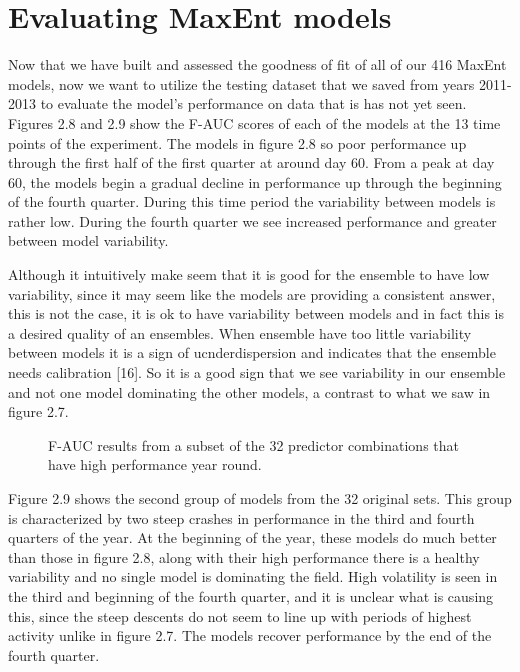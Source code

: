\section{Evaluating MaxEnt models}

Now that we have built and assessed the goodness of fit of all of our 416 MaxEnt models, now we want to utilize the testing dataset that we saved from years 2011-2013 to evaluate the model's performance on data that is has not yet seen. Figures 2.8 and 2.9 show the F-AUC scores of each of the models at the 13 time points of the experiment. The models in figure 2.8 so poor performance up through the first half of the first quarter at around day 60. From a peak at day 60, the models begin a gradual decline in performance up through the beginning of the fourth quarter. During this time period the variability between models is rather low. During the fourth quarter we see increased performance and greater between model variability. \newline

\noindent Although it intuitively make seem that it is good for the ensemble to have low variability, since it may seem like the models are providing a consistent answer, this is not the case, it is ok to have variability between models and in fact this is a desired quality of an ensembles. When ensemble have too little variability between models it is a sign of ucnderdispersion and indicates that the ensemble needs calibration [16]. So it is a good sign that we see variability in our ensemble and not one model dominating the other models, a contrast to what we saw in figure 2.7. \newline


\begin{figure} [!ht]
\centerline{}
\caption{F-AUC results from a subset of the 32 predictor combinations that have high performance year round. }
\label{fig6}
\end{figure}

\noindent Figure 2.9 shows the second group of models from the 32 original sets. This group is characterized by two steep crashes in performance in the third and fourth quarters of the year. At the beginning of the year, these models do much better than those in figure 2.8, along with their high performance there is a healthy variability and no single model is dominating the field. High volatility is seen in the third and beginning of the fourth quarter, and it is unclear what is causing this, since the steep descents do not seem to line up with periods of highest activity unlike in figure 2.7.  The models recover performance by the end of the fourth quarter. \newline


